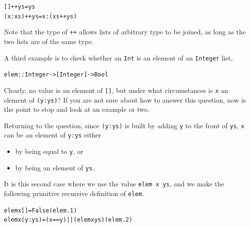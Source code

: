 \begin{example}
\begin{alltt}
[]     ++ ys = ys
(x:xs) ++ ys = x:(xs++ys)
\end{alltt}
Note that the type of \texttt{++} allows lists of arbitrary type to be joined,
as long as the two lists are of the same type.

A third example is to check whether an \texttt{Int} is an element of an
\texttt{Integer} list,
\begin{alltt}
elem :: Integer -> [Integer] -> Bool
\end{alltt}
Clearly, no value is an element of \texttt{[]}, but under what
circumstances is \texttt{x} an element of \texttt{(y:ys)}? 
If you are not sure about how to answer
this question, now is the point to stop and look at an example or two. 

Returning to
the question, since
\texttt{(y:ys)} is built by adding \texttt{y} to the front of \texttt{ys},
\texttt{x} can be an element of \texttt{y:ys} either
\begin{itemize}
\item by being equal to \texttt{y}, or
\item by being an element of \texttt{ys}.
\end{itemize}
It is this second case where we use the value \texttt{elem x ys}, and
we make the following primitive recursive definition of \texttt{elem}.
\begin{alltt}
elem x []     = False\hfill(elem.1)
elem x (y:ys) = (x==y) || (elem x ys)\hfill(elem.2)
\end{alltt}




\end{example}
